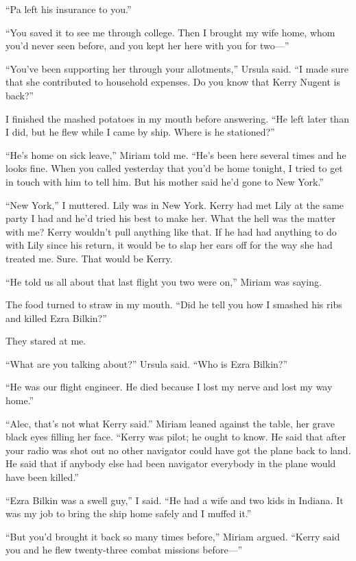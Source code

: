 {“Pa left his insurance to you.”

“You saved it to see me through college. Then I brought my wife home, whom you’d never seen before, and you kept her here with you for two—”

“You’ve been supporting her through your allotments,” Ursula said. “I made sure that she contributed to household expenses. Do you know that Kerry Nugent is back?”

I finished the mashed potatoes in my mouth before answering. “He left later than I did, but he flew while I came by ship. Where is he stationed?”

“He’s home on sick leave,” Miriam told me. “He’s been here several times and he looks fine. When you called yesterday that you’d be home tonight, I tried to get in touch with him to tell him. But his mother said he’d gone to New York.”

“New York,” I muttered. Lily was in New York. Kerry had met Lily at the same party I had and he’d tried his best to make her. What the hell was the matter with me? Kerry wouldn’t pull anything like that. If he had had anything to do with Lily since his return, it would be to slap her ears off for the way she had treated me. Sure. That would be Kerry.

“He told us all about that last flight you two were on,” Miriam was saying.

The food turned to straw in my mouth. “Did he tell you how I smashed his ribs and killed Ezra Bilkin?”

They stared at me.

“What are you talking about?” Ursula said. “Who is Ezra Bilkin?”

“He was our flight engineer. He died because I lost my nerve and lost my way home.”

“Alec, that’s not what Kerry said.” Miriam leaned against the table, her grave black eyes filling her face. “Kerry was pilot; he ought to know. He said that after your radio was shot out no other navigator could have got the plane back to land. He said that if anybody else had been navigator everybody in the plane would have been killed.”

“Ezra Bilkin was a swell guy,” I said. “He had a wife and two kids in Indiana. It was my job to bring the ship home safely and I muffed it.”

“But you’d brought it back so many times before,” Miriam argued. “Kerry said you and he flew twenty-three combat missions before—”

}

